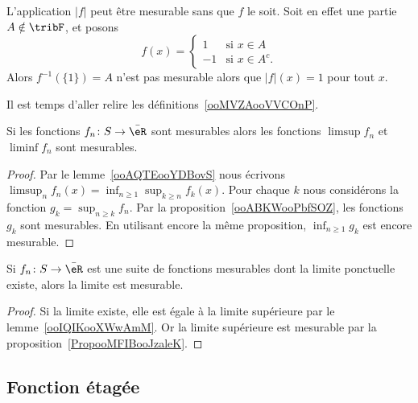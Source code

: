 \begin{remark}
    L'application \( | f |\) peut être mesurable sans que \( f\) le soit. Soit en effet une partie \( A\notin \tribF\), et posons
    \begin{equation}
        f(x)=\begin{cases}
            1   &   \text{si } x\in A   \\
            -1  &   \text{si } x\in A^c.
        \end{cases}
    \end{equation}
    Alors \( f^{-1}(\{ 1 \})=A\) n'est pas mesurable alors que \( | f |(x)=1\) pour tout \( x\).
\end{remark}

Il est temps d'aller relire les définitions~\ref{ooMVZAooVVCOnP}.

\begin{proposition}     \label{PropooMFIBooJzaleK}
    Si les fonctions \( f_n\colon S\to \bar \eR\) sont mesurables alors les fonctions \( \limsup f_n\) et \( \liminf f_n\) sont mesurables.
\end{proposition}

\begin{proof}
    Par le lemme~\ref{ooAQTEooYDBovS} nous écrivons \( \limsup_nf_n(x)=\inf_{n\geq 1}\sup_{k\geq n} f_k(x)\). Pour chaque \( k\) nous considérons la fonction \( g_k=\sup_{n\geq k}f_n\). Par la proposition~\ref{ooABKWooPbfSOZ}, les fonctions \( g_k\) sont mesurables. En utilisant encore la même proposition, \( \inf_{n\geq 1}g_k\) est encore mesurable.
\end{proof}

\begin{proposition}      \label{PropooDXBGooSFqrai}
    Si \( f_n\colon S\to \bar \eR\) est une suite de fonctions mesurables dont la limite ponctuelle existe, alors la limite est mesurable.
\end{proposition}

\begin{proof}
    Si la limite existe, elle est égale à la limite supérieure par le lemme~\ref{ooIQIKooXWwAmM}. Or la limite supérieure est mesurable par la proposition~\ref{PropooMFIBooJzaleK}.
\end{proof}

\subsection{Fonction étagée}

